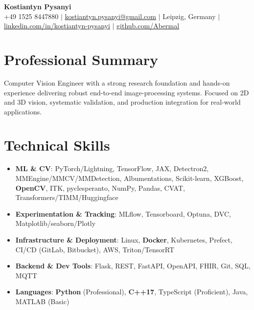 \documentclass[letterpaper,10pt]{article}
\newcommand{\resumeItem}[1]{
    \item\small{#1}\vspace{-0.5pt}
}
\newcommand{\resumeSubHeadingList}{\begin{itemize}[leftmargin=0.15in, label={}]\vspace{-2pt}}
\newcommand{\resumeSubHeadingListEnd}{\end{itemize}}
\begin{document}
\begin{center}
  \textbf{\Huge Kostiantyn Pysanyi}\vspace{4pt} \\
  \small +49 1525 8447880 $|$ \href{mailto:kostiantyn.pysanyi@gmail.com}{kostiantyn.pysanyi@gmail.com} $|$ Leipzig, Germany $|$
  \href{https://www.linkedin.com/in/kostiantyn-pysanyi/}{linkedin.com/in/kostiantyn-pysanyi} $|$ \href{https://github.com/Abermal}{github.com/Abermal}
\end{center}




\section{Professional Summary}
Computer Vision Engineer with a strong research foundation and hands-on experience delivering robust end-to-end image-processing systems. Focused on 2D and 3D vision, systematic validation, and production integration for real-world applications.

\section{Technical Skills}
\resumeSubHeadingList
  \resumeItem{\textbf{ML \& CV}: PyTorch/Lightning, TensorFlow, JAX, Detectron2, MMEngine/MMCV/MMDetection, Albumentations, Scikit-learn, XGBoost, \textbf{OpenCV}, ITK, pyclesperanto, NumPy, Pandas, CVAT, Transformers/TIMM/Huggingface}
  \resumeItem{\textbf{Experimentation \& Tracking}: MLflow, Tensorboard, Optuna, DVC, Matplotlib/seaborn/Plotly}
  \resumeItem{\textbf{Infrastructure \& Deployment}: Linux, \textbf{Docker}, Kubernetes, Prefect, CI/CD (GitLab, Bitbucket), AWS, Triton/TensorRT}
  \resumeItem{\textbf{Backend \& Dev Tools}: Flask, REST, FastAPI, OpenAPI, FHIR, Git, SQL, MQTT}
  \resumeItem{\textbf{Languages}: \textbf{Python} (Professional), \textbf{C++17}, TypeScript (Proficient), Java, MATLAB (Basic)}
\resumeSubHeadingListEnd
\end{document}
